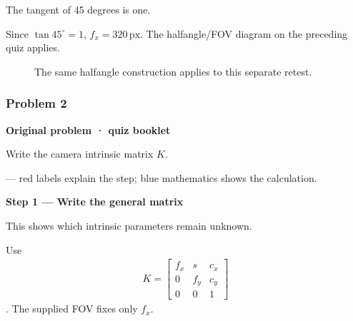 \documentclass[letterpaper,11pt,english,openany,oneside]{jupyterBook}
\begin{document}
\sphinxAtStartPar
{} The tangent of 45 degrees is one.

\sphinxAtStartPar
Since {\color{QuizMathBlue} \(\tan45^\circ=1\)}, {\color{QuizMathBlue} \(\boxed{f_x=320\,\mathrm{px}}\)}. The half\sphinxhyphen{}angle/FOV diagram on the preceding quiz applies.

\par

\begin{figure}[H]
\centering
\capstart

\noindent{}
\caption{The same half\sphinxhyphen{}angle construction applies to this separate retest.}\label{\detokenize{lectures/lecture03/quiz-workbook:id9}}\end{figure}


\subsubsection{Problem 2}
\label{\detokenize{lectures/lecture03/quiz-workbook:quiz-11-q2}}\label{\detokenize{lectures/lecture03/quiz-workbook:id2}}
\par\medskip\textbf{Original problem · quiz booklet}\par\smallskip

\sphinxAtStartPar
Write the camera intrinsic matrix \(K\).

\par\medskip

\sphinxAtStartPar
{} — red labels explain the step; blue mathematics shows the calculation.

\par\medskip{}
{\color{QuizStepRed}\bfseries Step 1 — Write the general matrix}\par\smallskip

\sphinxAtStartPar
{} This shows which intrinsic parameters remain unknown.

\sphinxAtStartPar
Use
{\color{QuizMathBlue} \begin{equation*}
\begin{split}
K=\begin{bmatrix}f_x&s&c_x\\0&f_y&c_y\\0&0&1\end{bmatrix}
\end{split}
\end{equation*}}
\sphinxAtStartPar
. The supplied FOV fixes only {\color{QuizMathBlue} \(f_x\)}.
\end{document}
